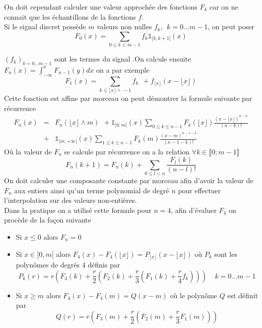On doit cependant calculer une valeur approchée des fonctions $F_{k}$  car on ne connait que les échantillons de la fonctions $f$.\\
Si le signal discret possède $m$ valeurs non nulles $f_k,~~k=0...m-1$, on peut poser 
\begin{equation*}
F_{0} (x) =\underset{0\le k \le m-1}{\sum}f_{k} \mathds{1}_{[k,k+1[}(x)
\end{equation*}

$(f_k)_{k=0...m-1}$ sont les termes du signal .On calcule ensuite $F_{n}(x)=\int_{-\infty}^{x}F_{n-1}(y)dx$ on a par exemple
\begin{equation*}
F_{1}(x)=\underset{k\le \lfloor x\rfloor \wedge~-1}{\sum}f_{k}~~+ f_{\lfloor x\rfloor}
(x-\lfloor x\rfloor)
\end{equation*}
Cette fonction est affine par morceau on peut démontrer la formule suivante par récurrence
\begin{eqnarray*}
F_{n}(x) &=& F_{n}(\lfloor x\rfloor \wedge m)~~+\mathds{1}_{[0,m[}(x) \underset{0\le k \le n-1}{\sum}F_{k}(\lfloor x \rfloor) \frac{(x-\lfloor x \rfloor)^{n-k}}{(n-k)!}\\
          &+&\mathds{1}_{[m,+\infty[}(x)\underset{1\le k \le n-1}{\sum}F_{k}(m) \frac{(x-m)^{n-1-k}}{(n-1-k)!}
\end{eqnarray*}
Où la valeur de $F_{n}$ se calcule par récurrence on a la relation $\forall k \in \llbracket 0 ;m-1 \rrbracket$
\begin{equation*}
F_{n}(k+1)=F_{n}(k)+\underset{0\le l < n}{\sum} \frac{F_{l}(k)}{(n-l)!}
\end{equation*}
On doit calculer une composante constante par morceau afin d'avoir la valeur de $F_{n}$ aux entiers  ainsi qu'un terme polynomial de degré $n$ pour effectuer l'interpolation sur des valeurs non-entières.\\
Dans la pratique on a utilisé cette formule pour $n=4$, afin d'évaluer $F_4$ on procède de la façon suivante 
\begin{itemize}
\item Si $x\le 0$ alors $F_{n}=0$
\item Si $x\in ]0 , m[$ alors $F_{4}(x)-F_{4}(\lfloor x \rfloor)=P_{\lfloor x \rfloor}(x-\lfloor x \rfloor)$ où $P_k$ sont les polynômes de degrés $4$ définis par
\begin{equation*}
P_k (r) =r \left( F_{3}(k) +\frac{r}{2} \left(F_{2}(k)+ \frac{r}{3}\left(F_{1}(k)+\frac{r}{4} f_{k}\right)\right)\right)~~~~~k=0...m-1
\end{equation*}
\item Si $x\ge m$ alors $F_{4}(x)-F_{4}(m)=Q(x-m)$ où le polynôme $Q$ est définit par
\begin{equation*}
Q(r)=r \left(F_{3}(m)+\frac{r}{2} \left( F_{2}(m) + \frac{r}{3} F_1 (m)\right)\right)
\end{equation*}

\end{itemize}
